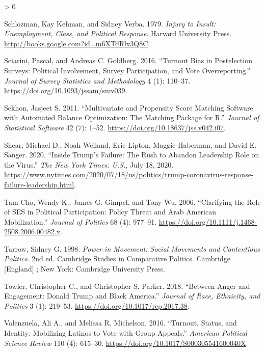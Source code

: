 \documentclass[
  12pt,
]{article}
\newlength{\cslhangindent}
\newenvironment{CSLReferences}[2] %
 {%
  \setlength{\parindent}{0pt}
  \ifodd #1 \everypar{\setlength{\hangindent}{\cslhangindent}}\ignorespaces\fi
  \ifnum #2 > 0
  \setlength{\parskip}{#2\baselineskip}
  \fi
 }%
 {}
\begin{document}
\begin{CSLReferences}{1}{0}
\leavevmode\hypertarget{ref-Schlozman1979}{}%
Schlozman, Kay Kehman, and Sidney Verba. 1979. \emph{Injury to {Insult}: {Unemployment}, {Class}, and {Political Response}}. {Harvard University Press}. \url{http://books.google.com?id=m6XTdRlx3Q8C}.

\leavevmode\hypertarget{ref-Sciarini2016}{}%
Sciarini, Pascal, and Andreas C. Goldberg. 2016. {``Turnout {Bias} in {Postelection Surveys}: {Political Involvement}, {Survey Participation}, and {Vote Overreporting}.''} \emph{Journal of Survey Statistics and Methodology} 4 (1): 110--37. \url{https://doi.org/10.1093/jssam/smv039}.

\leavevmode\hypertarget{ref-Sekhon2011}{}%
Sekhon, Jasjeet S. 2011. {``Multivariate and {Propensity Score Matching Software} with {Automated Balance Optimization}: {The Matching} Package for {R}.''} \emph{Journal of Statistical Software} 42 (7): 1--52. \url{https://doi.org/10.18637/jss.v042.i07}.

\leavevmode\hypertarget{ref-Shear2020}{}%
Shear, Michael D., Noah Weiland, Eric Lipton, Maggie Haberman, and David E. Sanger. 2020. {``Inside {Trump}'s {Failure}: {The Rush} to {Abandon Leadership Role} on the {Virus}.''} \emph{The New York Times: U.S.}, July 18, 2020. \url{https://www.nytimes.com/2020/07/18/us/politics/trump-coronavirus-response-failure-leadership.html}.

\leavevmode\hypertarget{ref-TamCho2006a}{}%
Tam Cho, Wendy K., James G. Gimpel, and Tony Wu. 2006. {``Clarifying the {Role} of {SES} in {Political Participation}: {Policy Threat} and {Arab American Mobilization}.''} \emph{Journal of Politics} 68 (4): 977--91. \url{https://doi.org/10.1111/j.1468-2508.2006.00482.x}.

\leavevmode\hypertarget{ref-Tarrow1998}{}%
Tarrow, Sidney G. 1998. \emph{Power in Movement: Social Movements and Contentious Politics}. 2nd ed. Cambridge Studies in Comparative Politics. {Cambridge {[}England{]} ; New York}: {Cambridge University Press}.

\leavevmode\hypertarget{ref-Towler2018}{}%
Towler, Christopher C., and Christopher S. Parker. 2018. {``Between {Anger} and {Engagement}: {Donald Trump} and {Black America}.''} \emph{Journal of Race, Ethnicity, and Politics} 3 (1): 219--53. \url{https://doi.org/10.1017/rep.2017.38}.

\leavevmode\hypertarget{ref-Valenzuela2016}{}%
Valenzuela, Ali A., and Melissa R. Michelson. 2016. {``Turnout, {Status}, and {Identity}: {Mobilizing Latinos} to {Vote} with {Group Appeals}.''} \emph{American Political Science Review} 110 (4): 615--30. \url{https://doi.org/10.1017/S000305541600040X}.


\end{CSLReferences}
\end{document}
